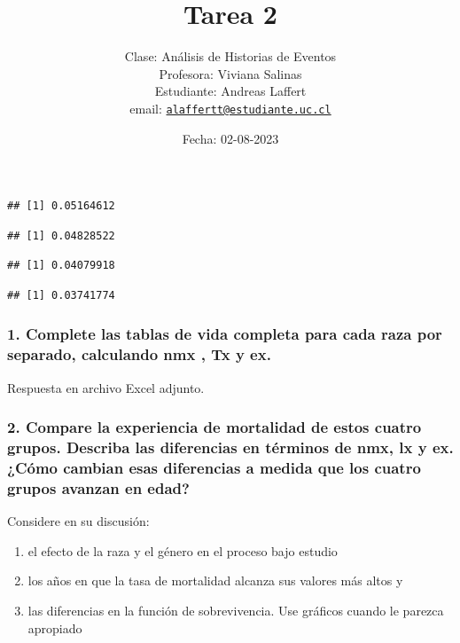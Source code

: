 \documentclass[
  12pt,
]{article}
\title{\textbf{Tarea 2}}
\author{Clase: Análisis de Historias de Eventos\\
Profesora: Viviana Salinas\\
Estudiante: Andreas Laffert\\
email:
\href{mailto:alaffertt@estudiante.uc.cl}{\nolinkurl{alaffertt@estudiante.uc.cl}}}
\date{Fecha: 02-08-2023}
\providecommand{\tightlist}{%
  \setlength{\itemsep}{0pt}\setlength{\parskip}{0pt}}
\begin{document}
\maketitle

\begin{verbatim}
## [1] 0.05164612
\end{verbatim}

\begin{verbatim}
## [1] 0.04828522
\end{verbatim}

\begin{verbatim}
## [1] 0.04079918
\end{verbatim}

\begin{verbatim}
## [1] 0.03741774
\end{verbatim}

\hypertarget{complete-las-tablas-de-vida-completa-para-cada-raza-por-separado-calculando-nmx-tx-y-ex.}{%
\subsubsection{1. Complete las tablas de vida completa para cada raza
por separado, calculando nmx , Tx y
ex.}\label{complete-las-tablas-de-vida-completa-para-cada-raza-por-separado-calculando-nmx-tx-y-ex.}}

Respuesta en archivo Excel adjunto.

\hypertarget{compare-la-experiencia-de-mortalidad-de-estos-cuatro-grupos.-describa-las-diferencias-en-tuxe9rminos-de-nmx-lx-y-ex.-cuxf3mo-cambian-esas-diferencias-a-medida-que-los-cuatro-grupos-avanzan-en-edad}{%
\subsubsection{2. Compare la experiencia de mortalidad de estos cuatro
grupos. Describa las diferencias en términos de nmx, lx y ex. ¿Cómo
cambian esas diferencias a medida que los cuatro grupos avanzan en
edad?}\label{compare-la-experiencia-de-mortalidad-de-estos-cuatro-grupos.-describa-las-diferencias-en-tuxe9rminos-de-nmx-lx-y-ex.-cuxf3mo-cambian-esas-diferencias-a-medida-que-los-cuatro-grupos-avanzan-en-edad}}

Considere en su discusión:

\begin{enumerate}
\def\labelenumi{\alph{enumi})}
\tightlist
\item
  el efecto de la raza y el género en el proceso bajo estudio
\item
  los años en que la tasa de mortalidad alcanza sus valores más altos y
\item
  las diferencias en la función de sobrevivencia. Use gráficos cuando le
  parezca apropiado
\end{enumerate}
\end{document}
